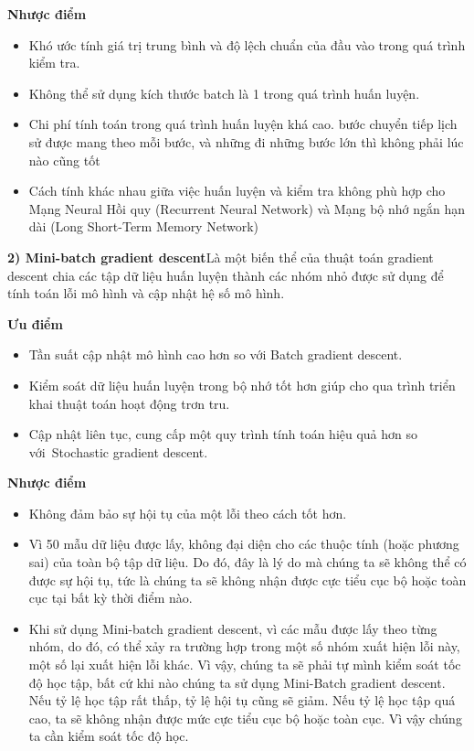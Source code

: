 \documentclass{article}
\begin{document}
	\textbf{Nhược điểm}
	\begin{itemize}
		\item Khó ước tính giá trị trung bình và độ lệch chuẩn của đầu vào trong quá trình kiểm tra.
		\item Không thể sử dụng kích thước batch là 1 trong quá trình huấn luyện.
		\item Chi phí tính toán trong quá trình huấn luyện khá cao. bước chuyển tiếp lịch sử được mang theo mỗi bước, và những đi những bước lớn thì không phải lúc nào cũng tốt
		\item Cách tính khác nhau giữa việc huấn luyện và kiểm tra không phù hợp cho Mạng Neural Hồi quy (Recurrent Neural Network) và Mạng bộ nhớ ngắn hạn dài (Long Short-Term Memory Network)
	\end{itemize}
	
	\textbf{2) Mini-batch gradient descent}Là một biến thể của thuật toán gradient descent chia các tập dữ liệu huấn luyện thành các nhóm nhỏ được sử dụng để tính toán lỗi mô hình và cập nhật hệ số mô hình.
	
	\textbf{Ưu điểm}
	\begin{itemize}
		\item Tần suất cập nhật mô hình cao hơn so với Batch gradient descent.
		\item Kiểm soát dữ liệu huấn luyện trong bộ nhớ tốt hơn giúp cho qua trình triển khai thuật toán hoạt động trơn tru.
		\item Cập nhật liên tục, cung cấp một quy trình tính toán hiệu quả hơn so với Stochastic gradient descent.
	\end{itemize}
	\textbf{Nhược điểm}
		\begin{itemize}
		\item Không đảm bảo sự hội tụ của một lỗi theo cách tốt hơn.
		\item Vì 50 mẫu dữ liệu được lấy, không đại diện cho các thuộc tính (hoặc phương sai) của toàn bộ tập dữ liệu. Do đó, đây là lý do mà chúng ta sẽ không thể có được sự hội tụ, tức là chúng ta sẽ không nhận được cực tiểu cục bộ hoặc toàn cục tại bất kỳ thời điểm nào.
		\item Khi sử dụng Mini-batch gradient descent, vì các mẫu được lấy theo từng nhóm, do đó, có thể xảy ra trường hợp trong một số nhóm xuất hiện lỗi này, một số lại xuất hiện lỗi khác. Vì vậy, chúng ta sẽ phải tự mình kiểm soát tốc độ học tập, bất cứ khi nào chúng ta sử dụng Mini-Batch gradient descent. Nếu tỷ lệ học tập rất thấp, tỷ lệ hội tụ cũng sẽ giảm. Nếu tỷ lệ học tập quá cao, ta sẽ không nhận được mức cực tiểu cục bộ hoặc toàn cục. Vì vậy chúng ta cần kiểm soát tốc độ học.
	\end{itemize}
\end{document}
